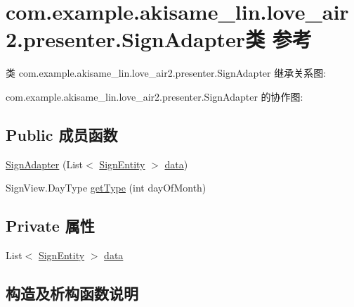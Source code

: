 \hypertarget{classcom_1_1example_1_1akisame__lin_1_1love__air2_1_1presenter_1_1_sign_adapter}{}\section{com.\+example.\+akisame\+\_\+lin.\+love\+\_\+air2.\+presenter.\+Sign\+Adapter类 参考}
\label{classcom_1_1example_1_1akisame__lin_1_1love__air2_1_1presenter_1_1_sign_adapter}


类 com.\+example.\+akisame\+\_\+lin.\+love\+\_\+air2.\+presenter.\+Sign\+Adapter 继承关系图\+:


com.\+example.\+akisame\+\_\+lin.\+love\+\_\+air2.\+presenter.\+Sign\+Adapter 的协作图\+:
\subsection*{Public 成员函数}
\begin{DoxyCompactItemize}
\item 
\mbox{\hyperlink{classcom_1_1example_1_1akisame__lin_1_1love__air2_1_1presenter_1_1_sign_adapter_a681cef41a83256bf04a8312902050d90}{Sign\+Adapter}} (List$<$ \mbox{\hyperlink{classcom_1_1example_1_1akisame__lin_1_1love__air2_1_1presenter_1_1_sign_entity}{Sign\+Entity}} $>$ \mbox{\hyperlink{classcom_1_1example_1_1akisame__lin_1_1love__air2_1_1presenter_1_1_sign_adapter_a0ec5ed14e180ab94fba4a5d393458634}{data}})
\item 
Sign\+View.\+Day\+Type \mbox{\hyperlink{classcom_1_1example_1_1akisame__lin_1_1love__air2_1_1presenter_1_1_sign_adapter_a75a9cdd51c6bffe7bd483b858c2a276d}{get\+Type}} (int day\+Of\+Month)
\end{DoxyCompactItemize}
\subsection*{Private 属性}
\begin{DoxyCompactItemize}
\item 
List$<$ \mbox{\hyperlink{classcom_1_1example_1_1akisame__lin_1_1love__air2_1_1presenter_1_1_sign_entity}{Sign\+Entity}} $>$ \mbox{\hyperlink{classcom_1_1example_1_1akisame__lin_1_1love__air2_1_1presenter_1_1_sign_adapter_a0ec5ed14e180ab94fba4a5d393458634}{data}}
\end{DoxyCompactItemize}


\subsection{构造及析构函数说明}
\mbox{\label{classcom_1_1example_1_1akisame__lin_1_1love__air2_1_1presenter_1_1_sign_adapter_a681cef41a83256bf04a8312902050d90}} 
